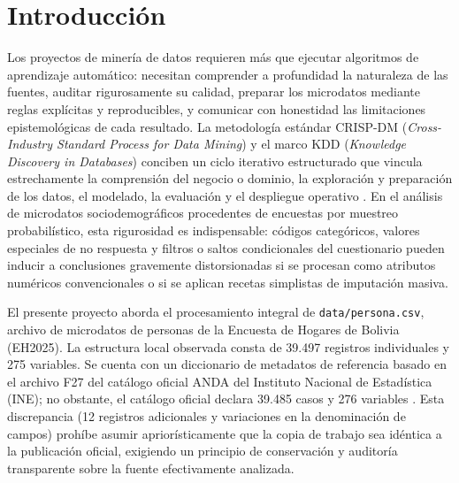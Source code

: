 \section{Introducción}

Los proyectos de minería de datos requieren más que ejecutar algoritmos de aprendizaje automático: necesitan comprender a profundidad la naturaleza de las fuentes, auditar rigurosamente su calidad, preparar los microdatos mediante reglas explícitas y reproducibles, y comunicar con honestidad las limitaciones epistemológicas de cada resultado. La metodología estándar CRISP-DM (\textit{Cross-Industry Standard Process for Data Mining}) y el marco KDD (\textit{Knowledge Discovery in Databases}) conciben un ciclo iterativo estructurado que vincula estrechamente la comprensión del negocio o dominio, la exploración y preparación de los datos, el modelado, la evaluación y el despliegue operativo \parencite{chapman2000crisp, fayyad1996data}. En el análisis de microdatos sociodemográficos procedentes de encuestas por muestreo probabilístico, esta rigurosidad es indispensable: códigos categóricos, valores especiales de no respuesta y filtros o saltos condicionales del cuestionario pueden inducir a conclusiones gravemente distorsionadas si se procesan como atributos numéricos convencionales o si se aplican recetas simplistas de imputación masiva.

El presente proyecto aborda el procesamiento integral de \texttt{data/persona.csv}, archivo de microdatos de personas de la Encuesta de Hogares de Bolivia (EH2025). La estructura local observada consta de 39.497 registros individuales y 275 variables. Se cuenta con un diccionario de metadatos de referencia basado en el archivo F27 del catálogo oficial ANDA del Instituto Nacional de Estadística (INE); no obstante, el catálogo oficial declara 39.485 casos y 276 variables \parencite{ineeh2025persona}. Esta discrepancia (12 registros adicionales y variaciones en la denominación de campos) prohíbe asumir apriorísticamente que la copia de trabajo sea idéntica a la publicación oficial, exigiendo un principio de conservación y auditoría transparente sobre la fuente efectivamente analizada.

